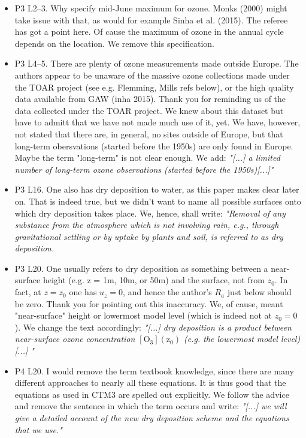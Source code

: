 \documentclass{scrartcl}
\begin{document}
\begin{itemize}
\item {\color{blue}P3 L2--3. Why specify mid-June maximum for ozone. Monks (2000) might
  take issue with that, as would for example Sinha et al. (2015).}
  The referee has got a point here. Of cause the maximum of ozone in the annual cycle depends on the location. We remove this specification.
\item {\color{blue}P3 L4--5. There are plenty of ozone measurements made outside Europe. The
authors appear to be unaware of the massive ozone collections made under the
TOAR project (see e.g. Flemming, Mills refs below), or the high quality data
available from GAW (inha 2015).}
  Thank you for reminding us of the data collected under the TOAR project. We knew about this dataset but have to admitt that we have not made much use of it, yet. We have, however, not stated that there are, in general, no sites outside of Europe, but that long-term obersvations (started before the 1950s) are only found in Europe. Maybe the term "long-term" is not clear enough. We add: \emph{"[...] a limited number of long-term ozone observations (started before the 1950s)[...]"}
  
\item {\color{blue}P3 L16. One also has dry deposition to water, as this paper makes clear later on.}
  That is indeed true, but we didn't want to name all possible surfaces onto which dry deposition takes place. We, hence, shall write: \emph{"Removal of any substance from the atmosphere which is not involving rain, e.g., through gravitational settling or by uptake by plants and soil, is referred to as dry deposition.}
  
\item {\color{blue}P3 L20. One usually refers to dry deposition as something between a near-
surface height (e.g. z = 1m, 10m, or 50m) and the surface, not from $z_0$. In fact,
at $z = z_0$ one has $u_z = 0$, and hence the author’s $R_a$ just below should be zero.}
Thank you for pointing out this inaccuracy. We, of cause, meant "near-surface" height or lowermost model level (which is indeed not at $z_0=0$). We change the text accordingly: \emph{"[...] dry deposition is a product between near-surface ozone concentration $\mathrm{[O_3](z_0)}$ (e.g. the lowermost model level) [...] "}
  
\item {\color{blue}P4 L20. I would remove the term textbook knowledge, since there are many
different approaches to nearly all these equations. It is thus good that the equations
as used in CTM3 are spelled out explicitly.}
  We follow the advice and remove the sentence in which the term occurs and write: \emph{"[...] we will give a detailed account of the new dry deposition scheme and the equations that we use."}
  

\end{itemize}
\end{document}
